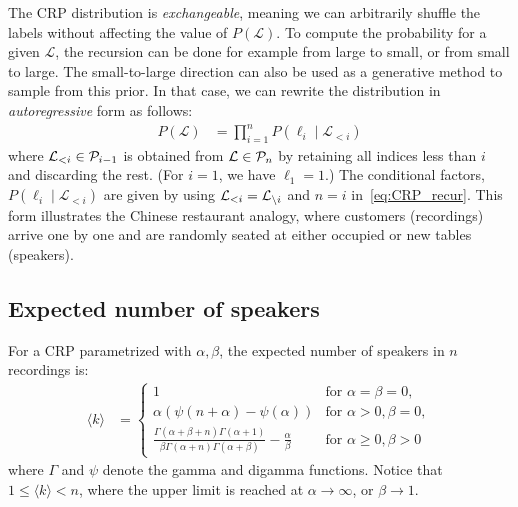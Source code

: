 \documentclass[a4paper,oneside,12pt,english]{report}
\def\expp#1{\bigl\langle#1\bigr\rangle}
\def\Lset{\mathcal{L}}
\begin{document}
The CRP distribution is \emph{exchangeable}, meaning we can arbitrarily shuffle the labels without affecting the value of $P(\Lset)$. To compute the probability for a given $\Lset$, the recursion can be done for example from large to small, or from small to large. The small-to-large direction can also be used as a generative method to sample from this prior. In that case, we can rewrite the distribution in \emph{autoregressive} form as follows:
\begin{align}
\label{eq:CRP_AR}
P(\Lset) &= \prod_{i=1}^n P(\ell_i\mid\Lset_{<i})
\end{align}
where $\Lset_{<i}\in\Pset_{i-1}$ is obtained from $\Lset\in\Pset_n$ by retaining all indices less than $i$ and discarding the rest. (For $i=1$, we have $\ell_1=1$.) The conditional factors, $P(\ell_i\mid\Lset_{<i})$ are given by using $\Lset_{<i}=\Li$ and $n=i$ in~\eqref{eq:CRP_recur}.  This form illustrates the Chinese restaurant analogy, where customers (recordings) arrive one by one and are randomly seated at either occupied or new  tables (speakers).   



\subsection{Expected number of speakers}
For a CRP parametrized with $\alpha,\beta$, the expected number of speakers in $n$ recordings is:
\begin{align}
\label{eq:CRP_ev}
\expp{k}{} &= \begin{cases}
1& \text{for $\alpha=\beta=0$},\\
\alpha(\psi(n+\alpha)-\psi(\alpha))&   \text{for $\alpha>0, \beta=0$}, \\
\frac{\Gamma(\alpha+\beta+n)\Gamma(\alpha+1)}{\beta\Gamma(\alpha+n)\Gamma(\alpha+\beta)}-\frac{\alpha}{\beta}&   \text{for $\alpha\ge0, \beta>0$}
\end{cases}
\end{align}
where $\Gamma$ and $\psi$ denote the gamma and digamma functions. Notice that $1\le\expp{k}<n$, where the upper limit is reached at $\alpha\to\infty$, or $\beta\to1$. 
\end{document}
